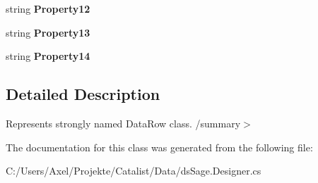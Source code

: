 \begin{DoxyCompactItemize}
\item 
string {\bfseries Property12}\hypertarget{class_products_1_1_data_1_1ds_sage_1_1_preset_row_aa4f39a57aaf8f54b5260074f303ac74f}{}\label{class_products_1_1_data_1_1ds_sage_1_1_preset_row_aa4f39a57aaf8f54b5260074f303ac74f}

\item 
string {\bfseries Property13}\hypertarget{class_products_1_1_data_1_1ds_sage_1_1_preset_row_add12bd906d611dd7edb15219516002d6}{}\label{class_products_1_1_data_1_1ds_sage_1_1_preset_row_add12bd906d611dd7edb15219516002d6}

\item 
string {\bfseries Property14}\hypertarget{class_products_1_1_data_1_1ds_sage_1_1_preset_row_a191620bd15198a51bf8d06098cbed3be}{}\label{class_products_1_1_data_1_1ds_sage_1_1_preset_row_a191620bd15198a51bf8d06098cbed3be}

\end{DoxyCompactItemize}


\subsection{Detailed Description}
Represents strongly named Data\+Row class. /summary$>$ 

The documentation for this class was generated from the following file\+:\begin{DoxyCompactItemize}
\item 
C\+:/\+Users/\+Axel/\+Projekte/\+Catalist/\+Data/ds\+Sage.\+Designer.\+cs\end{DoxyCompactItemize}

